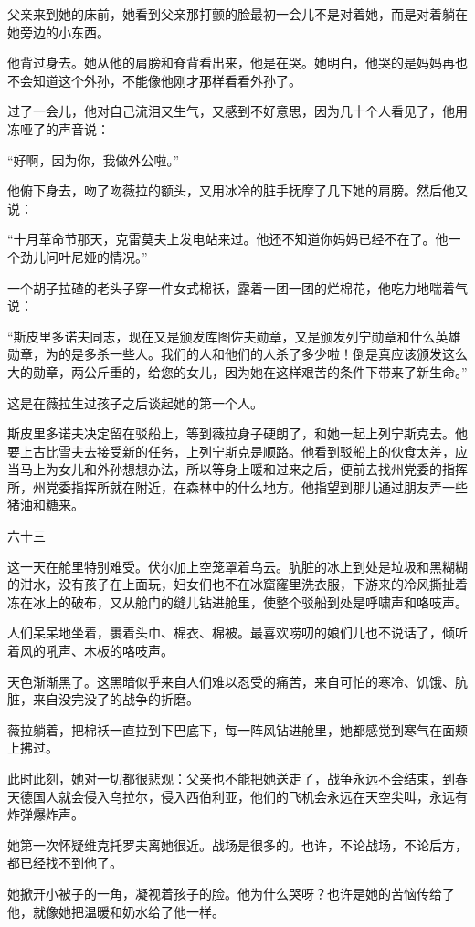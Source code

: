 父亲来到她的床前，她看到父亲那打颤的脸最初一会儿不是对着她，而是对着躺在她旁边的小东西。

他背过身去。她从他的肩膀和脊背看出来，他是在哭。她明白，他哭的是妈妈再也不会知道这个外孙，不能像他刚才那样看看外孙了。

过了一会儿，他对自己流泪又生气，又感到不好意思，因为几十个人看见了，他用冻哑了的声音说：

“好啊，因为你，我做外公啦。”

他俯下身去，吻了吻薇拉的额头，又用冰冷的脏手抚摩了几下她的肩膀。然后他又说：

“十月革命节那天，克雷莫夫上发电站来过。他还不知道你妈妈已经不在了。他一个劲儿问叶尼娅的情况。”

一个胡子拉碴的老头子穿一件女式棉袄，露着一团一团的烂棉花，他吃力地喘着气说：

“斯皮里多诺夫同志，现在又是颁发库图佐夫勋章，又是颁发列宁勋章和什么英雄勋章，为的是多杀一些人。我们的人和他们的人杀了多少啦！倒是真应该颁发这么大的勋章，两公斤重的，给您的女儿，因为她在这样艰苦的条件下带来了新生命。”

这是在薇拉生过孩子之后谈起她的第一个人。

斯皮里多诺夫决定留在驳船上，等到薇拉身子硬朗了，和她一起上列宁斯克去。他要上古比雪夫去接受新的任务，上列宁斯克是顺路。他看到驳船上的伙食太差，应当马上为女儿和外孙想想办法，所以等身上暖和过来之后，便前去找州党委的指挥所，州党委指挥所就在附近，在森林中的什么地方。他指望到那儿通过朋友弄一些猪油和糖来。

六十三

这一天在舱里特别难受。伏尔加上空笼罩着乌云。肮脏的冰上到处是垃圾和黑糊糊的泔水，没有孩子在上面玩，妇女们也不在冰窟窿里洗衣服，下游来的冷风撕扯着冻在冰上的破布，又从舱门的缝儿钻进舱里，使整个驳船到处是呼啸声和咯吱声。

人们呆呆地坐着，裹着头巾、棉衣、棉被。最喜欢唠叨的娘们儿也不说话了，倾听着风的吼声、木板的咯吱声。

天色渐渐黑了。这黑暗似乎来自人们难以忍受的痛苦，来自可怕的寒冷、饥饿、肮脏，来自没完没了的战争的折磨。

薇拉躺着，把棉袄一直拉到下巴底下，每一阵风钻进舱里，她都感觉到寒气在面颊上拂过。

此时此刻，她对一切都很悲观：父亲也不能把她送走了，战争永远不会结束，到春天德国人就会侵入乌拉尔，侵入西伯利亚，他们的飞机会永远在天空尖叫，永远有炸弹爆炸声。

她第一次怀疑维克托罗夫离她很近。战场是很多的。也许，不论战场，不论后方，都已经找不到他了。

她掀开小被子的一角，凝视着孩子的脸。他为什么哭呀？也许是她的苦恼传给了他，就像她把温暖和奶水给了他一样。

